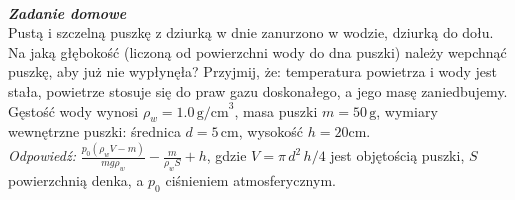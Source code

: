 \documentclass[11pt,a4paper]{article}
\newcounter{zaddom}\newcommand{\zaddom}[1][]{\addtocounter{zaddom}{1} ~\\  {\bf \emph{Zadanie domowe \arabic{zaddom} #1 }} \\}
\begin{document}
\zaddom
Pustą i szczelną puszkę z dziurką w dnie zanurzono w wodzie, dziurką do dołu. Na jaką głębokość (liczoną od powierzchni wody do dna puszki) należy wepchnąć puszkę, aby już nie wypłynęła? Przyjmij, że: temperatura powietrza i wody jest stała, powietrze stosuje się do praw gazu doskonałego, a jego masę zaniedbujemy. Gęstość wody wynosi $\rho_w = 1.0\,\textrm{g/cm}^3$, masa puszki $m = 50\,\textrm{g}$, wymiary wewnętrzne puszki: średnica $d = 5\,\textrm{cm}$, wysokość $h = 20\textrm{cm}$.\\
{\em Odpowiedź:} $\frac{p_0(\rho_w V-m)}{mg\rho_w} - \frac{m}{\rho_wS} + h$,
gdzie $V = \pi\,d^2\,h/4$ jest objętością puszki, $S$ powierzchnią denka, a $p_0$ ciśnieniem atmosferycznym.
\end{document}
